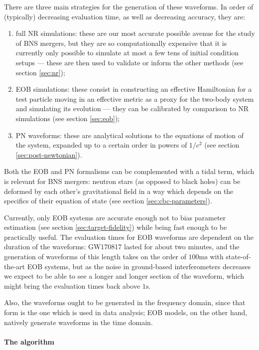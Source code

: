\documentclass[main.tex]{subfiles}
\begin{document}
There are three main strategies for the generation of these waveforms. In order of (typically) decreasing evaluation time, as well as decreasing accuracy, they are:
\begin{enumerate}
    \item full \ac{NR} simulations: these are our most accurate possible avenue for the study of \ac{BNS} mergers, but they are so computationally expensive that it is currently only possible to simulate at most a few tens of initial condition setups --- these are then used to validate or inform the other methods (see section \ref{sec:nr});
    \item \ac{EOB} simulations: these consist in constructing an effective Hamiltonian for a test particle moving in an effective metric as a proxy for the two-body system and simulating its evolution --- they can be calibrated by comparison to \ac{NR} simulations (see section \ref{sec:eob});
    \item \ac{PN} waveforms: these are analytical solutions to the equations of motion of the system, expanded up to a certain order in powers of $1/c^2$ (see section \ref{sec:post-newtonian}).
\end{enumerate}

Both the \ac{EOB} and \ac{PN} formalisms can be complemented with a tidal term, which is relevant for \ac{BNS} mergers: neutron stars (as opposed to black holes) can be deformed by each other's gravitational field in a way which depends on the specifics of their equation of state (see section \ref{sec:cbc-parameters}). 

Currently, only \ac{EOB} systems are accurate enough not to bias parameter estimation (see section \ref{sec:target-fidelity}) while being fast enough to be practically useful.
The evaluation times for \ac{EOB} waveforms are dependent on the duration of the waveforms: GW170817 lasted for about two minutes, and the generation of waveforms of this length takes on the order of $100\text{ms}$ with state-of-the-art \ac{EOB} systems, but as the noise in ground-based interferometers decreases we expect to be able to see a longer and longer section of the waveform, which might bring the evaluation times back above $1\text{s}$.

Also, the waveforms ought to be generated in the frequency domain, since that form is the one which is used in data analysis;
EOB models, on the other hand, natively generate waveforms in the time domain. 

\paragraph{The algorithm}
\end{document}
